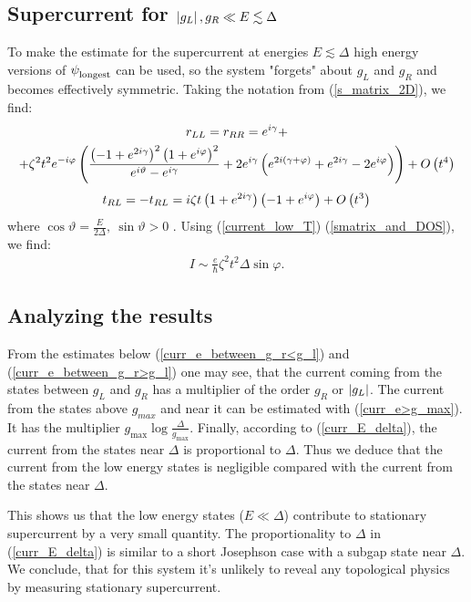 \subsection{Supercurrent for $\left|g_L\right|, g_R\ll E \lesssim \Delta $}

\label{subsec:supercurrent_sim_Delta}

To make the estimate for the supercurrent at energies $ E\lesssim \Delta$ high energy versions of $ \psi_{\mathrm{longest}}^{\mathrm{}} $ can be used, so the system "forgets" about $ g_L $ and $ g_R $ and becomes effectively symmetric. Taking the notation from (\ref{s_matrix_2D}), we find:
\begin{multline}
	r_{LL}=r_{RR}
	=
	e^{i \gamma }+
	\\
	+
	\zeta ^2 t^2 e^{-i \varphi } \left(\frac{\left(-1+e^{2 i \gamma }\right)^2 \left(1+e^{i \varphi }\right)^2}{e^{i \vartheta }-e^{i \gamma }}+2 e^{i \gamma } \left(e^{2 i (\gamma +\varphi )}+e^{2 i \gamma }-2 e^{i \varphi }\right)\right)
	+O\left(t^4\right)
	\end{multline}
\begin{gather}
	t_{RL}=-t_{RL}
	=
	i \zeta  t\left(1+e^{2 i \gamma }\right)  \left(-1+e^{i \varphi }\right)
	+
	O\left(t^3 	\right)
\end{gather}
where $\cos\vartheta =\frac{E}{2\Delta},~ \sin\vartheta>0$ .
Using (\ref{current_low_T}) (\ref{smatrix_and_DOS}), we find:
\begin{gather}
\label{curr_E_delta}
I
\sim
	\frac{e}{\hbar}
	\zeta ^2 t^2\Delta
	\sin\varphi.
\end{gather}

\subsection{Analyzing the results}
From the estimates below 	(\ref{curr_e_between_g_r<g_l}) and (\ref{curr_e_between_g_r>g_l}) one may see, that the current coming from the states between $ g_L $ and $ g_R $ has a multiplier of the order $ g_{R} $ or $ \left|g_L\right| $. The current from the states above $ g_{max} $ and near it can be estimated with (\ref{curr_e>g_max}). It has the multiplier $ g_{\mathrm{max}}\log\frac{\Delta}{g_{\mathrm{max}}} $. Finally, according to (\ref{curr_E_delta}), the current from the states near $ \Delta $ is proportional to $ \Delta $. Thus we deduce that the current from the low energy states is negligible compared with the current from the states near $ \Delta. $ 


This shows us that the low energy states ($ E\ll\Delta $) contribute to stationary supercurrent by a very small quantity. The proportionality to $ \Delta $ in (\ref{curr_E_delta}) is similar to  a short Josephson case with a subgap state near $ \Delta $. We conclude, that for this system it's unlikely to reveal any topological physics by measuring stationary supercurrent.
	

